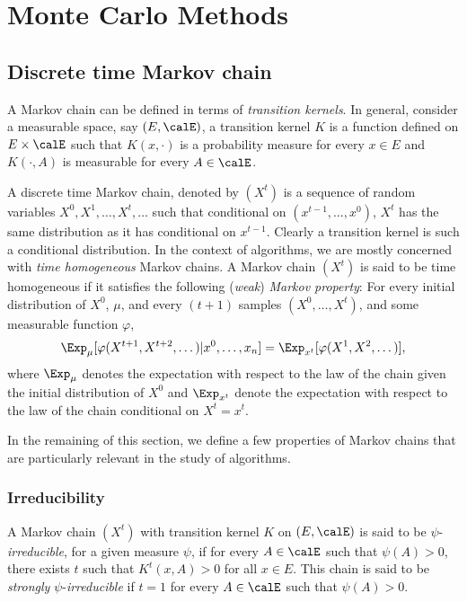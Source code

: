 \chapter{Monte Carlo Methods}
\label{cha:Appendix Monte Carlo Methods}

\section{Discrete time Markov chain}
\label{sec:Appendix Discrete time Markov chain}

A Markov chain can be defined in terms of \emph{transition kernels}. In
general, consider a measurable space, say $(E,\calE)$, a transition kernel
$K$ is a function defined on $E\times\calE$ such that $K(x,\cdot)$ is a
probability measure for every $x\in E$ and $K(\cdot,A)$ is measurable for
every $A\in\calE$.

A discrete time Markov chain, denoted by $(X^t)$ is a sequence of random
variables $X^0,X^1,\dots,X^t,\dots$ such that conditional on
$(x^{t-1},\dots,x^0)$, $X^t$ has the same distribution as it has conditional
on $x^{t-1}$. Clearly a transition kernel is such a conditional distribution.
In the context of \mcmc algorithms, we are mostly concerned with \emph{time
homogeneous} Markov chains. A Markov chain $(X^t)$ is said to be time
homogeneous if it satisfies the following (\emph{weak}) \emph{Markov
property}: For every initial distribution of $X^0$, $\mu$, and every $(t+1)$
samples $(X^0,\dots,X^t)$, and some measurable function $\varphi$,
\begin{equation}
  \Exp_{\mu}[\varphi(X^{t+1},X^{t+2},\dots)|x^0,\dots,x_n] =
  \Exp_{x^t}[\varphi(X^1,X^2,\dots)],
\end{equation}
where $\Exp_{\mu}$ denotes the expectation with respect to the law of the
chain given the initial distribution of $X^0$ and $\Exp_{x^t}$ denote the
expectation with respect to the law of the chain conditional on $X^t = x^t$.

In the remaining of this section, we define a few properties of Markov chains that are particularly relevant in the study of \mcmc algorithms.

\subsection{Irreducibility}
\label{sub: Appdendix Irreducibility}

A Markov chain $(X^t)$ with transition kernel $K$ on $(E,\calE)$ is said to
be $\psi$-\emph{irreducible}, for a given measure $\psi$, if for every
$A\in\calE$ such that $\psi(A)>0$, there exists $t$ such that $K^t(x,A)>0$
for all $x\in E$. This chain is said to be \emph{strongly}
$\psi$-\emph{irreducible} if $t=1$ for every $A\in\calE$ such that
$\psi(A)>0$.

